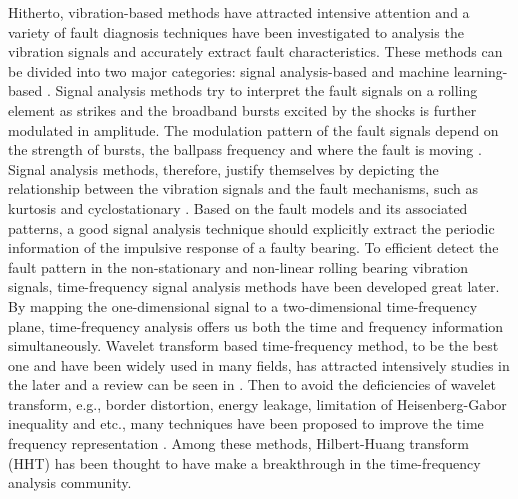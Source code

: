 \documentclass[journal]{IEEEtran}
\theoremstyle{definition}
\begin{document}
 Hitherto, vibration-based methods have attracted intensive attention and  a variety of fault diagnosis techniques have been  investigated to analysis the vibration signals and accurately extract fault characteristics. These methods can be divided into two major categories: signal analysis-based and machine learning-based \cite{yang2019intelligent}. Signal analysis methods try to interpret the fault signals on a rolling element as strikes and the broadband bursts excited by the shocks is further modulated in amplitude. The modulation pattern of the fault signals depend on the strength of bursts, the ballpass frequency and where the fault is moving \cite{randall2011rolling}. Signal analysis methods, therefore, justify themselves by depicting the relationship between the vibration signals and the fault mechanisms, such as kurtosis \cite{antoni2006spectral} and cyclostationary \cite{ming2011weak}. Based on the fault models and its associated patterns, a good signal analysis technique should explicitly  extract the periodic information of the impulsive response of a faulty bearing.  To efficient detect the fault pattern in the non-stationary and non-linear rolling bearing vibration signals, time-frequency signal analysis methods have been developed great later. By mapping the one-dimensional signal to a two-dimensional time-frequency plane, time-frequency analysis offers us both the time and frequency information simultaneously. Wavelet transform based time-frequency method, to be the best one and have been widely used in many fields, has attracted intensively studies in the later and a review can be seen in \cite{peng2004application}. Then to avoid the deficiencies of wavelet transform, e.g., border distortion, energy leakage, limitation of Heisenberg-Gabor inequality and etc., many techniques have been proposed to improve the time frequency representation \cite{ziaja2016fault,chen2013chirplet,chen2015adaptive}.  Among these methods, Hilbert-Huang transform (HHT) \cite{huang1999new,huang2014hilbert} has been thought to have make a breakthrough in the time-frequency analysis community.  
 
\end{document}
